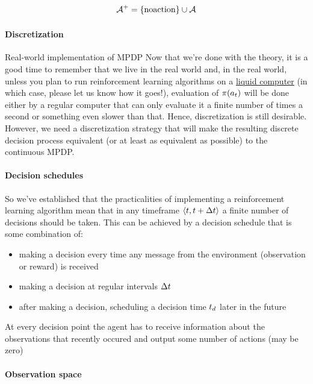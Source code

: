 \begin{equation} 
  \mathcal{A}^{+} = \{\text{noaction} \} \cup \mathcal{A}
\end{equation}

\paragraph{Discretization}

Real-world implementation of MPDP 
Now that we're done with the theory, it is a good time to remember that we live in the real world and, in the real world, unless you plan to run reinforcement learning algorithms on a \href{https://royalsocietypublishing.org/doi/10.1098/rstb.2018.0372}{liquid computer} (in which case, please let us know how it goes!), evaluation of $\pi(a_t)$ will be done either by a regular computer that can only evaluate it a finite number of times a second or something even slower than that. Hence, discretization is still desirable. However, we need a discretization strategy that will make the resulting discrete decision process equivalent (or at least as equivalent as possible) to the continuous MPDP.

\paragraph{Decision schedules}

So we've established that the practicalities of implementing a reinforcement learning algorithm mean that in any timeframe $\langle t, t + \Delta t \rangle$ a finite number of decisions should be taken. This can be achieved by a decision schedule that is some combination of:

\begin{itemize}
\item   making a decision every time any message from the environment   (observation or reward) is received 
\item   making a decision at regular intervals $\Delta t$ 
\item   after making a decision, scheduling a decision time $t_d$ later in the future
\end{itemize}

At every decision point the agent has to receive information about the observations that recently occured and output some number of actions (may be zero)

\paragraph{Observation space}

